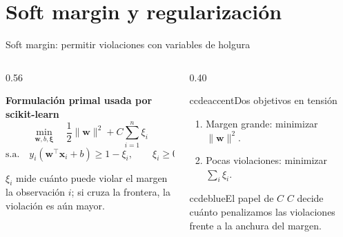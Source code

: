 \section{Soft margin y regularización}

\begin{frame}{Soft margin: permitir violaciones con variables de holgura}
\footnotesize
\begin{columns}[T,onlytextwidth]
\begin{column}{0.56\textwidth}
\begin{ccdebox}
\centering
\textbf{Formulación primal usada por scikit-learn}
\[
\min_{\mathbf w,b,\boldsymbol\xi}
\quad
\frac{1}{2}\|\mathbf w\|^2
+ C\sum_{i=1}^{n}\xi_i
\]
\[
\text{s.a.}\quad
 y_i(\mathbf w^\top\mathbf x_i+b)\ge 1-\xi_i,
\qquad \xi_i\ge 0
\]
\end{ccdebox}
\vspace{0.12cm}
\begin{keybox}
$\xi_i$ mide cuánto puede violar el margen la observación $i$; si cruza la frontera, la violación es aún mayor.
\end{keybox}
\end{column}
\begin{column}{0.40\textwidth}
\begin{contrastbox}{ccdeaccent}{Dos objetivos en tensión}
\footnotesize
\begin{enumerate}
  \item Margen grande: minimizar $\|\mathbf w\|^2$.
  \item Pocas violaciones: minimizar $\sum_i \xi_i$.
\end{enumerate}
\end{contrastbox}
\vspace{0.14cm}
\begin{contrastbox}{ccdeblue}{El papel de $C$}
\footnotesize
$C$ decide cuánto penalizamos las violaciones frente a la anchura del margen.
\end{contrastbox}
\end{column}
\end{columns}
\end{frame}

